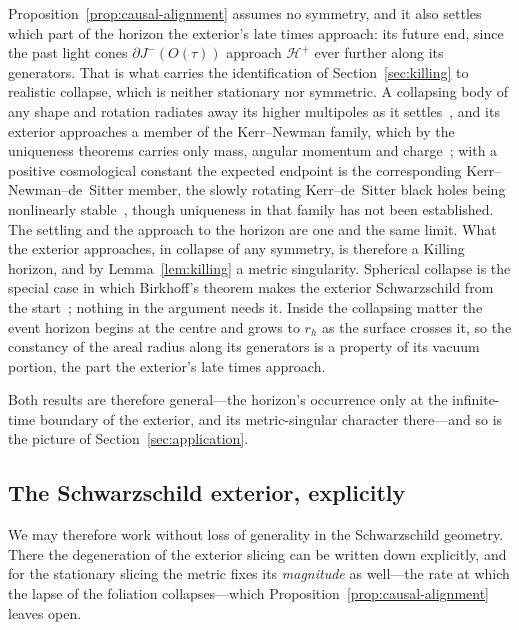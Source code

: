 \documentclass[11pt,a4paper]{article}
\theoremstyle{plain}
\theoremstyle{remark}
\begin{document}
Proposition~\ref{prop:causal-alignment} assumes no symmetry, and it also settles which part of the horizon the exterior's late times approach: its future end, since the past light cones $\partial J^-(O(\tau))$ approach $\mathcal{H}^+$ ever further along its generators. That is what carries the identification of Section~\ref{sec:killing} to realistic collapse, which is neither stationary nor symmetric. A collapsing body of any shape and rotation radiates away its higher multipoles as it settles~\cite{Price1972}, and its exterior approaches a member of the Kerr--Newman family, which by the uniqueness theorems carries only mass, angular momentum and charge~\cite{Israel1967,Carter1971,Robinson1975}; with a positive cosmological constant the expected endpoint is the corresponding Kerr--Newman--de~Sitter member, the slowly rotating Kerr--de~Sitter black holes being nonlinearly stable~\cite{HintzVasy2018}, though uniqueness in that family has not been established. The settling and the approach to the horizon are one and the same limit. What the exterior approaches, in collapse of any symmetry, is therefore a Killing horizon, and by Lemma~\ref{lem:killing} a metric singularity. Spherical collapse is the special case in which Birkhoff's theorem makes the exterior Schwarzschild from the start~\cite{Hawking1973}; nothing in the argument needs it. Inside the collapsing matter the event horizon begins at the centre and grows to $r_h$ as the surface crosses it, so the constancy of the areal radius along its generators is a property of its vacuum portion, the part the exterior's late times approach.

Both results are therefore general---the horizon's occurrence only at the infinite-time boundary of the exterior, and its metric-singular character there---and so is the picture of Section~\ref{sec:application}.

\subsection{The Schwarzschild exterior, explicitly}\label{sec:schwexplicit}

We may therefore work without loss of generality in the Schwarzschild geometry. There the degeneration of the exterior slicing can be written down explicitly, and for the stationary slicing the metric fixes its \emph{magnitude} as well---the rate at which the lapse of the foliation collapses---which Proposition~\ref{prop:causal-alignment} leaves open.
\end{document}
